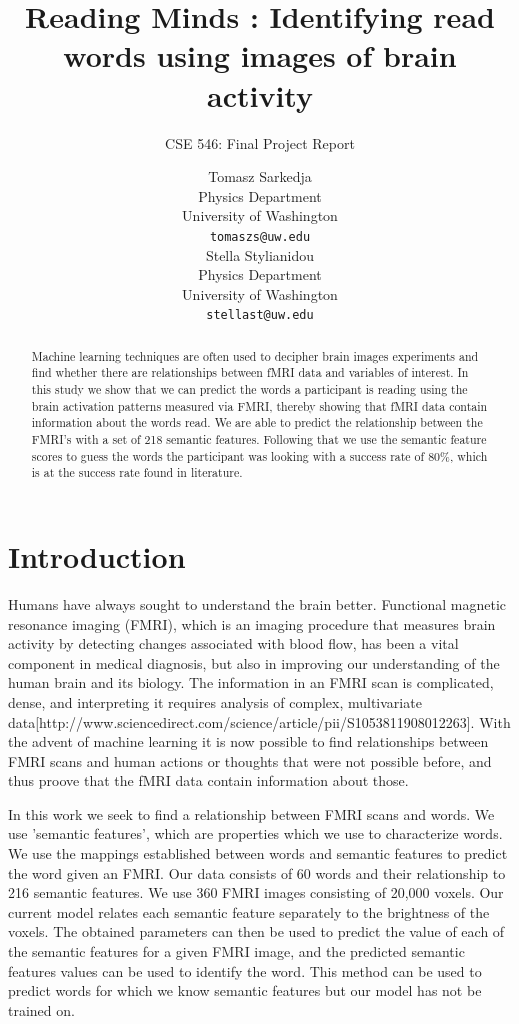 \documentclass{article} %
\title{Reading Minds : Identifying read words using images of brain activity}
\subtitle{CSE 546: Final Project Report}
\author{
Tomasz Sarkedja \\
Physics Department\\
University of Washington\\
\texttt{tomaszs@uw.edu} \\
\And
Stella Stylianidou \\
Physics Department\\
University of Washington\\
\texttt{stellast@uw.edu} \\
}
\begin{document}
\maketitle

\begin{abstract}
Machine learning techniques are often used to decipher brain images experiments and find whether there are relationships between fMRI data and variables of interest. In this study we show that we can predict the words a participant is reading using the brain activation patterns measured via FMRI, thereby showing that fMRI data contain information about the words read. We are able to predict the relationship between the FMRI's with a set of 218 semantic features. Following that we use the semantic feature scores to guess the words the participant was looking with a success rate of 80\%, which is at the success rate found in literature. 

\end{abstract}

\section{Introduction}

Humans have always sought to understand the brain better. Functional magnetic resonance imaging (FMRI), which is an imaging procedure that measures brain activity by detecting changes associated with blood flow, has been a vital component in medical diagnosis, but also in improving our understanding of the human brain and its biology. The information in an FMRI scan is complicated, dense, and interpreting it requires analysis of complex, multivariate data[http://www.sciencedirect.com/science/article/pii/S1053811908012263]. With the advent of machine learning it is now possible to find relationships between FMRI scans and human actions or thoughts that were not possible before, and thus proove that the fMRI data contain information about those.

In this work we seek to find a relationship between FMRI scans and words. We use 'semantic features', which are properties which we use to characterize words. We use the mappings established between words and semantic features to predict the word given an FMRI. Our data consists of 60 words and their relationship to 216 semantic features. We use 360 FMRI images consisting of 20,000 voxels. Our current model relates each semantic feature separately to the brightness of the voxels. The obtained parameters can then be used to predict the value of each of the semantic features for a given FMRI image, and the predicted semantic features values can be used to identify the word. This method can be used to predict words for which we know semantic features but our model has not be trained on.
\end{document}

